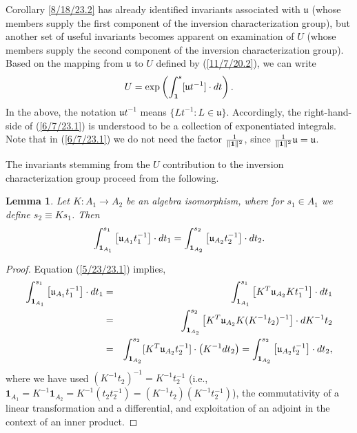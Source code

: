 \documentclass{amsart}
\numberwithin{equation}{section}
\newtheorem{lemma}[theorem]{Lemma}
\theoremstyle{definition}
\numberwithin{theorem}{section}
\begin{document}
Corollary \ref{8/18/23.2} has already identified invariants associated with $\mathfrak{u}$ (whose members supply the first component of the inversion characterization group), but another set of useful invariants becomes apparent on examination of $U$ (whose members supply the second component of the inversion characterization group).  Based on the mapping from $\mathfrak{u}$ to $ U$ defined by (\ref{11/7/20.2}),  we can write \begin{equation}  U = \exp\left(\int_{\bf 1}^s [\mathfrak{u}t^{-1}]\cdot dt\right). \label{6/7/23.1}\end{equation}  In the above, the notation $\mathfrak{u}t^{-1}$ means $\{Lt^{-1}: L\in \mathfrak{u}\}$.  Accordingly, the right-hand-side of (\ref{6/7/23.1}) is understood to be a collection of exponentiated integrals.   Note that in (\ref{6/7/23.1}) we do not need the factor $\frac{1}{\|{\bf 1}\|^2}$, since $\frac{1}{\|{\bf 1}\|^2}\mathfrak{u}=\mathfrak{u}$.  

\enlargethispage{2cm}



The invariants stemming from the $U$ contribution to the inversion characterization group proceed from the following. 



\begin{lemma}\label{6/6/23.2} Let $K:A_1\rightarrow A_2$ be an algebra isomorphism, where for $s_1\in A_1$ we define $s_2\equiv Ks_1$.  Then \[ \int_{{\bf 1}_{A_1}}^{s_1} \left[\mathfrak{u}_{A_1}t_1^{-1}\right]\cdot dt_1 
= \int_{{\bf 1}_{A_2}}^{s_2} \left[\mathfrak{u}_{A_2}t_2^{-1}\right]\cdot dt_2 . \] \end{lemma}

\begin{proof} 
Equation (\ref{5/23/23.1}) implies,
\begin{eqnarray*} \int_{{\bf 1}_{A_1}}^{s_1} \left[\mathfrak{u}_{A_1}t_1^{-1}\right]\cdot dt_1 &=& \int_{{\bf 1}_{A_1}}^{s_1} \left[ K^T\mathfrak{u}_{A_2}Kt_1^{-1}\right]\cdot dt_1 \\ &=& 
\int_{{\bf 1}_{A_2}}^{s_2} \left[ K^T\mathfrak{u}_{A_2}K (K^{-1}t_2)^{-1}\right]\cdot dK^{-1}t_2 \\ &=& \int_{{\bf 1}_{A_2}}^{s_2} [K^T\mathfrak{u}_{A_2}t_2^{-1}]\cdot \left(K^{-1}dt_2\right) = \int_{{\bf 1}_{A_2}}^{s_2} \left[\mathfrak{u}_{A_2}t_2^{-1}\right]\cdot dt_2, 
\end{eqnarray*}
where we have used $(K^{-1}t_2)^{-1} = K^{-1}t_2^{-1}$ (i.e., $\mathbf{1}_{A_1} = K^{-1}\mathbf{1}_{A_2} = K^{-1}(t_2t_2^{-1}) = (K^{-1}t_2)(K^{-1}t_2^{-1})$), the commutativity of a linear transformation and a differential, and exploitation of an adjoint in the context of an inner product.
\end{proof}
\end{document}
